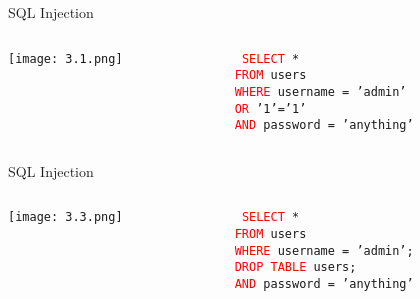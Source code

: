 \documentclass[t,ignorenonframetext]{beamer}
\begin{document}
\begin{frame}[fragile]{SQL Injection}

\begin{columns}[T] %
    \begin{column}{0.48\linewidth} %
        \texttt{[image: 3.1.png]}
    \end{column}
    
    \begin{column}{0.48\linewidth} %
        \texttt{%
        \newline
        \newline
        \newline
        \textcolor{red}{SELECT} * \\
        \textcolor{red}{FROM} users \\
        \textcolor{red}{WHERE} username = 'admin' \\
        \textcolor{red}{OR} '1'='1' \\
        \textcolor{red}{AND} password = 'anything'
        }
    \end{column}
\end{columns}

\end{frame}


\begin{frame}[fragile]{SQL Injection}

\begin{columns}[T] %
    \begin{column}{0.48\linewidth} %
        \texttt{[image: 3.3.png]}
    \end{column}
    
    \begin{column}{0.48\linewidth} %
        \texttt{%
        \newline
        \newline
        \newline
        \textcolor{red}{SELECT} * \\
        \textcolor{red}{FROM} users \\
        \textcolor{red}{WHERE} username = 'admin'; \\
        \textcolor{red}{DROP TABLE} users; \\
        \textcolor{red}{AND} password = 'anything'
        }
    \end{column}
\end{columns}

\end{frame}
\end{document}
